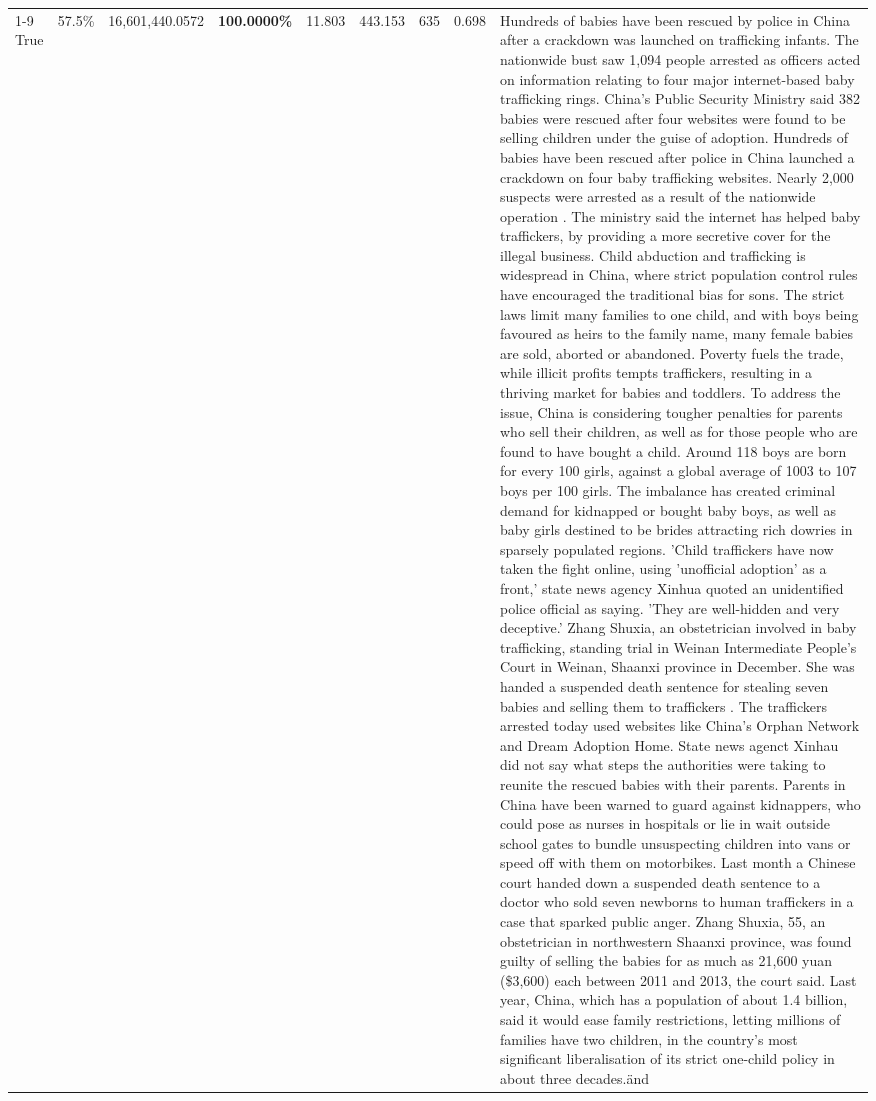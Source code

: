 \begin{table}[H]
\begin{tabular}{lllrlllll}
\cline{1-9}
True & 57.5\% & 16,601,440.0572 & \bfseries \color{red} 100.0000\% & 11.803 & 443.153 & 635 & 0.698 & Hundreds of babies have been rescued by police in China after a crackdown was launched on trafficking infants. The nationwide bust saw 1,094 people arrested as officers acted on information relating to four major internet-based baby trafficking rings. China's Public Security Ministry said 382 babies were rescued after four websites were found to be selling children under the guise of adoption. Hundreds of babies have been rescued after police in China launched a crackdown on four baby trafficking websites. Nearly 2,000 suspects were arrested as a result of the nationwide operation . The ministry said the internet has helped baby traffickers, by providing a more secretive cover for the illegal business. Child abduction and trafficking is widespread in China, where strict population control rules have encouraged the traditional bias for sons. The strict laws limit many families to one child, and with boys being favoured as heirs to the family name, many female babies are sold, aborted or abandoned. Poverty fuels the trade, while illicit profits tempts traffickers, resulting in a thriving market for babies and toddlers. To address the issue, China is considering tougher penalties for parents who sell their children, as well as for those people who are found to have bought a child. Around 118 boys are born for every 100 girls, against a global average of 1003 to 107 boys per 100 girls. The imbalance has created criminal demand for kidnapped or bought baby boys, as well as baby girls destined to be brides attracting rich dowries in sparsely populated regions. 'Child traffickers have now taken the fight online, using 'unofficial adoption' as a front,' state news agency Xinhua quoted an unidentified police official as saying. 'They are well-hidden and very deceptive.' Zhang Shuxia, an obstetrician involved in baby trafficking, standing trial in Weinan Intermediate People's Court in Weinan, Shaanxi province in December. She was handed a suspended death sentence for stealing seven babies and selling them to traffickers . The traffickers arrested today used websites like China's Orphan Network and Dream Adoption Home. State news agenct Xinhau did not say what steps the authorities were taking to reunite the rescued babies with their parents. Parents in China have been warned to guard against kidnappers, who could pose as nurses in hospitals or lie in wait outside school gates to bundle unsuspecting children into vans or speed off with them on motorbikes. Last month a Chinese court handed down a suspended death sentence to a doctor who sold seven newborns to human traffickers in a case that sparked public anger. Zhang Shuxia, 55, an obstetrician in northwestern Shaanxi province, was found guilty of selling the babies for as much as 21,600 yuan (\$3,600) each between 2011 and 2013, the court said. Last year, China, which has a population of about 1.4 billion, said it would ease family restrictions, letting millions of families have two children, in the country's most significant liberalisation of its strict one-child policy in about three decades.änd \\

\end{tabular}
\end{table}
